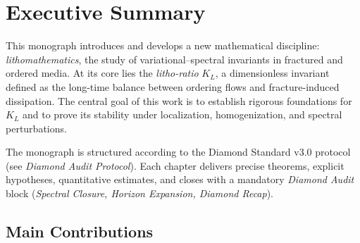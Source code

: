
\chapter*{Executive Summary}

\noindent
This monograph introduces and develops a new mathematical discipline: 
\emph{lithomathematics}, the study of variational--spectral invariants in 
fractured and ordered media. At its core lies the \emph{litho-ratio} $K_L$, 
a dimensionless invariant defined as the long-time balance between 
ordering flows and fracture-induced dissipation. The central goal of this work 
is to establish rigorous foundations for $K_L$ and to prove its stability 
under localization, homogenization, and spectral perturbations.

\medskip

\noindent
The monograph is structured according to the Diamond Standard v3.0 protocol 
(see \emph{Diamond Audit Protocol}). Each chapter delivers precise theorems, 
explicit hypotheses, quantitative estimates, and closes with a mandatory 
\emph{Diamond Audit} block (\emph{Spectral Closure, Horizon Expansion, 
Diamond Recap}).

\section*{Main Contributions}

